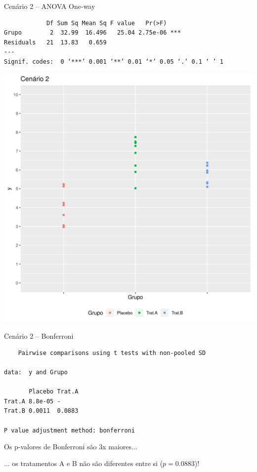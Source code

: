 \documentclass{beamer}
\begin{document}
\begin{frame}[fragile, label=cenario2-1way]
  \begin{exampleblock}{Cenário 2 -- ANOVA One-way}
    \tiny
\begin{verbatim}
            Df Sum Sq Mean Sq F value   Pr(>F)
Grupo        2  32.99  16.496   25.04 2.75e-06 ***
Residuals   21  13.83   0.659
---
Signif. codes:  0 ‘***’ 0.001 ‘**’ 0.01 ‘*’ 0.05 ‘.’ 0.1 ‘ ’ 1
\end{verbatim}
    \begin{center}
      \includegraphics[height=.5\textheight]{Cap13-30/cenario2}
    \end{center}
  \end{exampleblock}
\end{frame}


\begin{frame}[fragile]
  \begin{exampleblock}{Cenário 2 -- Bonferroni}
    \scriptsize
\begin{verbatim}
	Pairwise comparisons using t tests with non-pooled SD 

data:  y and Grupo 

       Placebo Trat.A
Trat.A 8.8e-05 -     
Trat.B 0.0011  0.0883

P value adjustment method: bonferroni
\end{verbatim}
  \end{exampleblock}
  \begin{block}{}
    \small
    Os p-valores de Bonferroni são 3x maiores...

    \bigskip
    ... os tratamentos A e B não são diferentes entre si ($p=0.0883$)!
  \end{block}
\end{frame}
\end{document}
